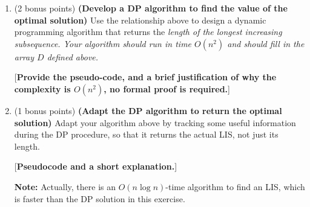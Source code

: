 \documentclass[12pt]{article}
\begin{document}
\begin{enumerate}
\begin{enumerate}
\item (2 bonus points) \textbf{(Develop a DP algorithm to find the value of the optimal solution)} Use the relationship above to design a dynamic programming algorithm that returns the \em length \em of the longest increasing subsequence.  Your algorithm should run in time $O(n^2)$ and should fill in the array $D$ defined above.

[\textbf{Provide the pseudo-code, and a brief justification of why the complexity is $O(n^2)$, no formal proof is required.}]

\item (1 bonus points) \textbf{(Adapt the DP algorithm to return the optimal solution)} Adapt your algorithm above by tracking some useful information during the DP procedure, so that it returns the actual LIS, not just its length.

[\textbf{Pseudocode and a short explanation.}]

\textbf{Note:} Actually, there is an $O(n\log n)$-time algorithm to find an LIS, which is faster than the DP solution in this exercise.

\end{enumerate}

\end{enumerate}
\end{document}
